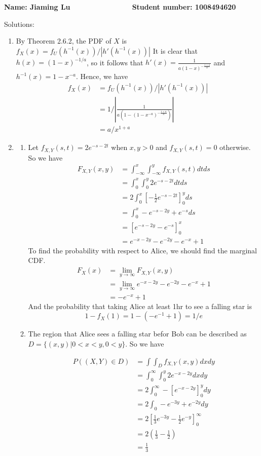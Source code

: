 \documentclass[a4paper, 12pt]{article}
\begin{document}
\textbf{Name: Jiaming Lu $~~~~~~~~~~~~~~~~~~~~~~~~~
~~~~~~~~~~~$ Student number: 1008494620}

Solutions:
\begin{enumerate}
	\item 
		By Theorem 2.6.2, the PDF of $X$ is 
		$f_X(x) = f_U(h^{-1}(x))/|h'(h^{-1}(x))|$
		It is clear that $h(x) = (1-x)^{-1/a}$, so it follows that
		$h'(x) = \frac{1}{a(1-x)^{- \frac{1+a}{a}}}$ and $h^{-1}(x) = 1-x^{-a}$.
		Hence, we have
		$$\begin{aligned}
			f_X(x) 
			&= f_U(h^{-1}(x))/|h'(h^{-1}(x))|\\
			&= 1/|\frac{1}{a(1-(1-x^{-a})^{- \frac{1+a}{a}})}|\\
			&= a/x^{1+a}
		\end{aligned}$$
	\item 
	\begin{enumerate}
		\item 
			Let $f_{X,Y}(s,t) = 2e^{-s-2t}$ when $x,y>0$ and 
			$f_{X,Y}(s,t) = 0$ otherwise. So we have
			$$\begin{aligned}
				F_{X,Y}(x,y) 
				&= \int _{-\infty}^x\int _{-\infty}^y f_{X,Y}(s,t)dtds\\
				&= \int_0^x\int _0 ^ y 2e^{-s-2t}dtds\\
				&= 2\int_0^x [-\frac{1}{2}e^{-s-2t}]_0^y ds\\
				&= \int _0^x -e^{-s-2y} + e^{-s}ds\\
				&= [e^{-s-2y}-e^{-s}]^x_0\\
				&= e^{-x-2y}-e^{-2y}-e^{-x}+1
			\end{aligned}$$
			To find the probability with respect to Alice, we should find the 
			marginal CDF.
			$$\begin{aligned}
			F_X(x) 
			&= \lim_{y\to \infty}F_{X,Y}(x,y)\\
			&= \lim_{y\to \infty}e^{-x-2y}-e^{-2y}-e^{-x}+1\\
			&= -e^{-x} + 1
			\end{aligned}$$
			And the probability that taking Alice at least 1hr to see a falling
			star is 
			$$1-f_X(1) = 1-(-e^{-1} + 1) = 1/e$$
		\item The region that Alice sees a falling star befor Bob can be 
			described as $D = \{(x,y)|0<x<y, 0<y\}$. So we have 

			$$\begin{aligned}
			P((X,Y)\in D) 
			&= \int\int_D f_{X,Y}(x,y)dxdy\\
			&= \int_0^\infty \int _0^y 2e^{-x-2y}dxdy\\
			&= 2\int_0^\infty -[e^{-x-2y}]^y_0dy\\
			&= 2\int_0 -e^{-3y} + e^{-2y}dy\\
			&= 2[\frac{1}{3}e^{-3y} - \frac{1}{2}e^{-y}]^\infty_0\\
			&= 2(\frac{1}{3} - \frac{1}{2})\\
			&= \frac{1}{3}
			\end{aligned}$$
	\end{enumerate}
\end{enumerate}
\end{document}

